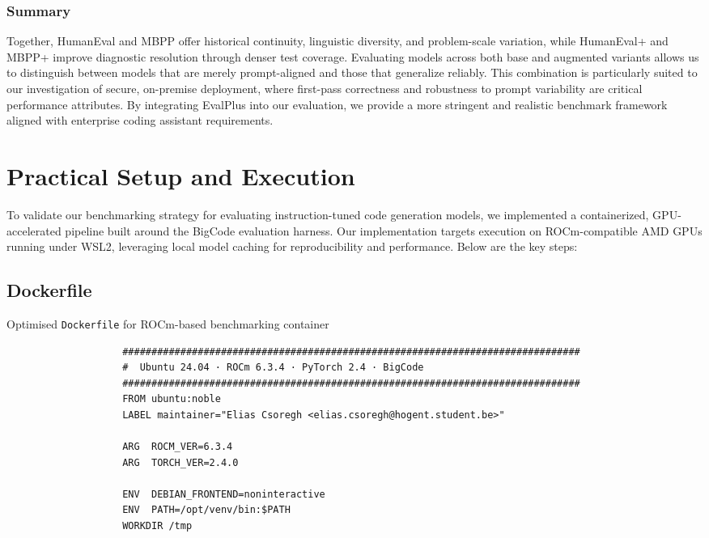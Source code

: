 \subsubsection*{Summary}
Together, HumanEval and MBPP offer historical continuity, linguistic diversity, and problem-scale variation, while HumanEval+ and MBPP+ improve diagnostic resolution through denser test coverage. Evaluating models across both base and augmented variants allows us to distinguish between models that are merely prompt-aligned and those that generalize reliably. This combination is particularly suited to our investigation of secure, on-premise deployment, where first-pass correctness and robustness to prompt variability are critical performance attributes. By integrating EvalPlus into our evaluation, we provide a more stringent and realistic benchmark framework aligned with enterprise coding assistant requirements.

\clearpage

\section{Practical Setup and Execution}

To validate our benchmarking strategy for evaluating instruction-tuned code generation models, we implemented a containerized, GPU-accelerated pipeline built around the BigCode evaluation harness. Our implementation targets execution on ROCm-compatible AMD GPUs running under WSL2, leveraging local model caching for reproducibility and performance. Below are the key steps:

\subsection{Dockerfile}

\begin{minipage}{\textwidth}
	\captionsetup{type=listing}
	\caption{Optimised \texttt{Dockerfile} for ROCm-based benchmarking container}
	\label{lst:dockerfile}

	\begin{verbatim}
                    ###############################################################################
                    #  Ubuntu 24.04 · ROCm 6.3.4 · PyTorch 2.4 · BigCode
                    ###############################################################################
                    FROM ubuntu:noble
                    LABEL maintainer="Elias Csoregh <elias.csoregh@hogent.student.be>"

                    ARG  ROCM_VER=6.3.4
                    ARG  TORCH_VER=2.4.0

                    ENV  DEBIAN_FRONTEND=noninteractive
                    ENV  PATH=/opt/venv/bin:$PATH
                    WORKDIR /tmp

    \end{verbatim}
\end{minipage}

